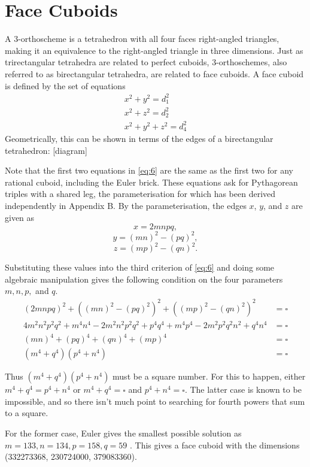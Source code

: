 \documentclass[11pt]{article}
\begin{document}
\section{Face Cuboids}
A 3-orthoscheme is a tetrahedron with all four faces right-angled triangles, making it an equivalence to the right-angled triangle in three dimensions. Just as trirectangular tetrahedra are related to perfect cuboids, 3-orthoschemes, also referred to as birectangular tetrahedra, are related to face cuboids.
A face cuboid is defined by the set of equations
\begin{equation}
\begin{aligned}
x^2+y^2=d_1^2 \\
x^2+z^2=d_2^2 \\
x^2+y^2+z^2=d_4^2
\end{aligned}
\label{eq:6}
\end{equation}
Geometrically, this can be shown in terms of the edges of a birectangular tetrahedron:
[diagram]

Note that the first two equations in \eqref{eq:6} are the same as the first two for any rational cuboid, including the Euler brick. These equations ask for Pythagorean triples with a shared leg, the parameterisation for which has been derived independently in Appendix B.
By the parameterisation, the edges $x$, $y$, and $z$ are given as
$$x=2mnpq,$$
$$y=(mn)^2-(pq)^2,$$
$$z=(mp)^2-(qn)^2.$$

Substituting these values into the third criterion of \eqref{eq:6} and doing some algebraic manipulation gives the following condition on the four parameters $m, n, p,$ and $q$.
\begin{equation*}
\begin{aligned}
(2mnpq)^2+((mn)^2-(pq)^2)^2+((mp)^2-(qn)^2)^2&=\square \\
4m^2n^2p^2q^2+m^4n^4-2m^2n^2p^2q^2+p^4q^4+m^4p^4-2m^2p^2q^2n^2+q^4n^4&=\square \\
(mn)^4+(pq)^4+(qn)^4+(mp)^4&=\square \\
(m^4+q^4)(p^4+n^4)&=\square
\end{aligned}
\end{equation*}

Thus $(m^4+q^4)(p^4+n^4)$ must be a square number. For this to happen, either $m^4+q^4=p^4+n^4$ or $m^4+q^4=\square$ and $p^4+n^4=\square$. The latter case is known to be impossible, and so there isn't much point to searching for fourth powers that sum to a square.

For the former case, Euler gives the smallest possible solution as $m=133, n=134, p=158, q=59$ \cite{eulerface}. This gives a face cuboid with the dimensions (332273368, 230724000, 379083360).
\end{document}
